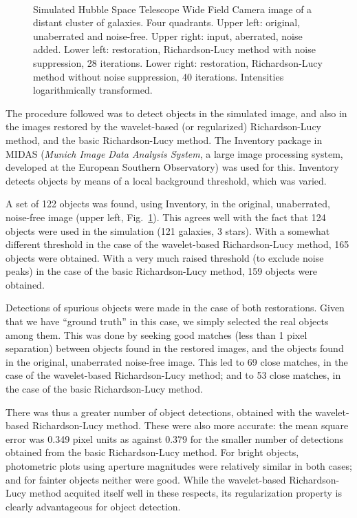 \documentclass[11pt,a4paper]{article}
\begin{document}
\begin{figure}[htb]
\centerline{
\hbox{
}}
\caption{Simulated Hubble Space Telescope 
Wide Field Camera image of a distant cluster of 
galaxies.  Four quadrants.  Upper left: original, unaberrated and noise-free.
Upper right: input, aberrated, noise added.  Lower left: restoration, 
Richardson-Lucy
method with noise suppression, 28 iterations.  Lower right: restoration, 
Richardson-Lucy method without noise suppression, 40 iterations.  Intensities 
logarithmically transformed.}
\label{fig_caulet_freudling}
\end{figure}

The procedure followed was to detect objects in the simulated image, and
also in the images restored by the wavelet-based (or regularized) 
Richardson-Lucy method, and the basic
Richardson-Lucy method.  The Inventory package in MIDAS ({\it Munich Image
Data Analysis System}, a large image processing system, developed at the 
European Southern Observatory) was used for this. 
Inventory detects objects by means of a local background threshold, which
was varied. 
 
A set of 122 objects was found, using Inventory, in the original, unaberrated,
noise-free image (upper left, Fig.\ \ref{fig_caulet_freudling}).  
This agrees well with the fact
that 124 objects were used in the simulation (121 galaxies, 3 stars).  
With a somewhat different 
threshold in the case of the wavelet-based Richardson-Lucy 
method, 165 objects were 
obtained.  With a very much raised threshold (to exclude noise peaks) in the
case of the basic Richardson-Lucy method, 159 objects were obtained.  

Detections of spurious objects were made in the case of both restorations.
Given that we have ``ground truth'' in this case, we simply selected the
real objects among them.  This was done by seeking good matches (less than
1 pixel separation) between objects found in the restored images, and the
objects found in the original, unaberrated noise-free image.  This led to
69 close matches, in the case of the wavelet-based Richardson-Lucy 
method; and to 53
close matches, in the case of the basic Richardson-Lucy method.
 
There was thus a  greater number of object detections, obtained with 
the wavelet-based Richardson-Lucy 
method.  These were also more accurate: the mean square
error was 0.349 pixel units 
as against 0.379 for the smaller number of detections 
obtained from the basic Richardson-Lucy 
method.  For bright objects, photometric plots
using aperture magnitudes were relatively similar in both cases; and for 
fainter objects neither were good.  
While the wavelet-based Richardson-Lucy method 
acquited itself well in these respects, its regularization property is 
clearly advantageous for object detection.
 
\end{document}
